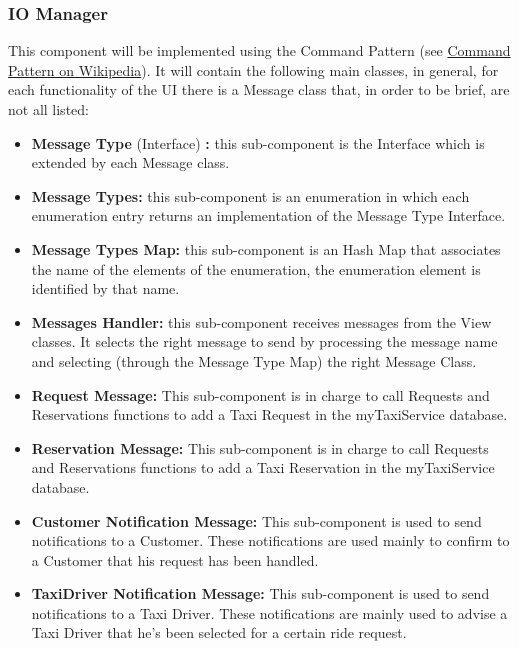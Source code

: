 \documentclass[../../../../../../../dd.tex]{subfiles}
\begin{document}
	\subsubsection{IO Manager}
		This component will be implemented using the Command Pattern (see \href{https://it.wikipedia.org/wiki/Command_pattern}{Command Pattern on Wikipedia}).
		It will contain the following main classes, in general, for each functionality of the UI there is a Message class that, in order to be brief, are not all listed:
		\begin{itemize}
			\item \textbf{Message Type} (Interface) \textbf{:} this sub-component is the Interface which is extended by each Message class. 

			\item \textbf{Message Types:} this sub-component is an enumeration in which each enumeration entry returns an implementation of the Message Type Interface.

			\item \textbf{Message Types Map:} this sub-component is an Hash Map that associates the name of the elements of the enumeration, the enumeration element is identified by that name.

			\item \textbf{Messages Handler:} this sub-component receives messages from the View classes. It selects the right message to send by processing the message name and selecting (through the Message Type Map) the right Message Class.

			\item \textbf{Request Message:} This sub-component is in charge to call Requests and Reservations functions to add a Taxi Request in the myTaxiService database.

			\item \textbf{Reservation Message:} This sub-component is in charge to call Requests and Reservations functions to add a Taxi Reservation in the myTaxiService database.

			\item \textbf{Customer Notification Message:} This sub-component is used to send notifications to a Customer. These notifications are used mainly to confirm to a Customer that his request has been handled.

			\item \textbf{TaxiDriver Notification Message:} This sub-component is used to send notifications to a Taxi Driver. These notifications are mainly used to advise a Taxi Driver that he's been selected for a certain ride request.


\end{itemize}
\end{document}
